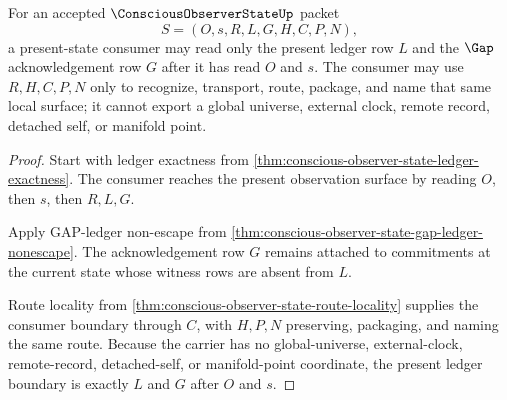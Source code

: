 \begin{theorem}
\label{thm:conscious-observer-state-present-ledger-boundary}
For an accepted $\ConsciousObserverStateUp$ packet
$$
S=(O,s,R,L,G,H,C,P,N),
$$
a present-state consumer may read only the present ledger row $L$ and the $\Gap$ acknowledgement row $G$ after it has read $O$ and $s$. The consumer may use $R,H,C,P,N$ only to recognize, transport, route, package, and name that same local surface; it cannot export a global universe, external clock, remote record, detached self, or manifold point.
\end{theorem}
\begin{proof}
Start with ledger exactness from \autoref{thm:conscious-observer-state-ledger-exactness}. The consumer reaches the present observation surface by reading $O$, then $s$, then $R,L,G$.

Apply GAP-ledger non-escape from \autoref{thm:conscious-observer-state-gap-ledger-nonescape}. The acknowledgement row $G$ remains attached to commitments at the current state whose witness rows are absent from $L$.

Route locality from \autoref{thm:conscious-observer-state-route-locality} supplies the consumer boundary through $C$, with $H,P,N$ preserving, packaging, and naming the same route. Because the carrier has no global-universe, external-clock, remote-record, detached-self, or manifold-point coordinate, the present ledger boundary is exactly $L$ and $G$ after $O$ and $s$.
\end{proof}

